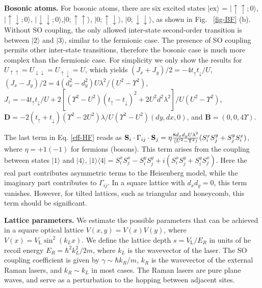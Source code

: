 \documentclass[a4paper,showpacs]{revtex4}
\begin{document}
\noindent \textbf{{\small Bosonic atoms.}} For bosonic atoms, there are six excited states $|%
\text{ex}\rangle $ = $|\uparrow \uparrow ;0\rangle $, $|\uparrow \downarrow
;0\rangle $, $|\downarrow \downarrow ;0\rangle $,$|0;\uparrow \uparrow
\rangle $, $|0;\uparrow \downarrow \rangle $, $|0;\downarrow \downarrow
\rangle $, as shown in Fig.~ \ref{fig-BF} (b). Without SO coupling, the only
allowed inter-state second-order transition is between $|2\rangle $ and $%
|3\rangle $, similar to the fermionic case. The presence of SO coupling
permits other inter-state transitions, therefore the bosonic case is much
more complex than the fermionic case. For simplicity we only show the
results for $U_{\uparrow \uparrow }=U_{\downarrow \downarrow }=U_{\uparrow
\downarrow }=U$, which yields $(J_{x}+J_{y})/2=-4t_{\uparrow }t_{\downarrow
}/U$, $(J_{x}-J_{y})/2=4(d_{x}^{2}-d_{y}^{2})U\lambda ^{2}/(U^{2}-\Upsilon
^{2})$, $J_{z}=-4t_{\uparrow }t_{\downarrow }/U+2\left[ (\Upsilon
^{2}-U^{2})(t_{\uparrow }-t_{\downarrow })^{2}+2U^{2}d^{2}\lambda ^{2}\right]
/U(U^{2}-\Upsilon ^{2})$, $\mathbf{D}=-2(t_{\uparrow }+t_{\downarrow
})(\Upsilon ^{2}-2U^{2})\lambda /U(\Upsilon ^{2}-U^{2})(dy,dx,0)$, and $%
\mathbf{B}=(0,0,4\Upsilon )$.

The last term in Eq. \ref{eff-HF} reads as $\mathbf{S}_{i}\cdot \Gamma
_{ij}\cdot \mathbf{S}_{j}=\eta {\frac{8d_{x}d_{y}U\lambda ^{2}}{%
(U^{2}-\Upsilon ^{2})}}(S_{i}^{x}S_{j}^{y}+S_{j}^{y}S_{i}^{x})$, where $\eta
=+1(-1)$ for fermions (bosons). This term arises from the coupling between
states $|1\rangle $ and $|4\rangle $, $|1\rangle \langle
4|=S_{i}^{x}S_{j}^{x}-S_{i}^{y}S_{j}^{y}+i(S_{i}^{x}S_{j}^{y}+S_{i}^{y}S_{j}^{x})
$. Here the real part contributes asymmetric terms to the Heisenberg model,
while the imaginary part contributes to $\Gamma _{ij}$. In a square lattice
with $d_{x}d_{y}=0$, this term vanishes. However, for tilted lattices, such
as triangular and honeycomb, this term should be significant.

\noindent \textbf{{\small Lattice parameters.}} We estimate the possible parameters that can be
achieved in a square optical lattice $V(x,y)=V(x)V(y)$, where $%
V(x)=V_{\text{L}}\sin ^{2}(k_{L}x)$.  We define the lattice depth $s=V_{\text{L}}/E_{R}$ in units of he recoil energy $%
E_{R}=\hbar ^{2}k_{L}^{2}/2m$, where $k_{L}$
is the wavevector of the laser. The SO coupling coefficient is given by $\gamma \sim \hbar
k_{R}/m$, $k_{R}$ is the wavevector of the external Raman lasers, and $%
k_{R}\sim k_{L}$ in most cases. The Raman lasers are pure plane waves, and
serve as a perturbation to the hopping between adjacent sites.
\end{document}
